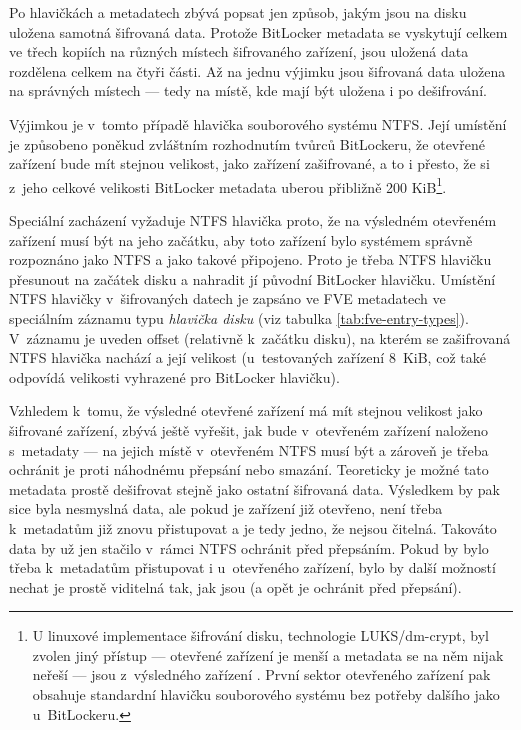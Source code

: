 Po hlavičkách a metadatech zbývá popsat jen způsob, jakým jsou na disku uložena samotná šifrovaná data. Protože BitLocker metadata se vyskytují celkem ve třech kopiích na různých místech  šifrovaného zařízení, jsou uložená data rozdělena celkem na čtyři části. Až na jednu výjimku jsou šifrovaná data uložena na správných místech --- tedy na místě, kde mají být uložena i po dešifrování.

Výjimkou je v~tomto případě hlavička souborového systému NTFS. Její umístění je způsobeno poněkud zvláštním rozhodnutím tvůrců BitLockeru, že otevřené zařízení bude mít stejnou velikost, jako zařízení zašifrované, a to i přesto, že si z~jeho celkové velikosti BitLocker metadata uberou přibližně 200 KiB\footnote{U linuxové implementace šifrování disku, technologie LUKS/dm-crypt, byl zvolen jiný přístup --- otevřené zařízení je menší a metadata se na něm nijak neřeší --- jsou z~výsledného zařízení . První sektor otevřeného zařízení pak obsahuje standardní hlavičku souborového systému bez potřeby dalšího  jako u~BitLockeru.}.


Speciální zacházení vyžaduje NTFS hlavička proto, že na výsledném otevřeném zařízení musí být na jeho začátku, aby toto zařízení bylo systémem správně rozpoznáno jako NTFS a jako takové připojeno. Proto je třeba NTFS hlavičku přesunout na začátek disku a nahradit jí původní BitLocker hlavičku. Umístění NTFS hlavičky v~šifrovaných datech je zapsáno ve FVE metadatech ve speciálním záznamu typu \emph{hlavička disku} (viz tabulka \ref{tab:fve-entry-types}). V~záznamu je uveden offset (relativně k~začátku disku), na kterém se zašifrovaná NTFS hlavička nachází a její velikost (u~testovaných zařízení 8~KiB, což také odpovídá velikosti vyhrazené pro BitLocker hlavičku).

Vzhledem k~tomu, že výsledné otevřené zařízení má mít stejnou velikost jako šifrované zařízení, zbývá ještě vyřešit, jak bude v~otevřeném zařízení naloženo s~metadaty --- na jejich místě v~otevřeném NTFS musí  být a zároveň je třeba ochránit je proti náhodnému přepsání nebo smazání. Teoreticky je možné tato metadata prostě dešifrovat stejně jako ostatní šifrovaná data. Výsledkem by pak sice byla nesmyslná data, ale pokud je zařízení již otevřeno, není třeba k~metadatům již znovu přistupovat a je tedy jedno, že nejsou čitelná. Takováto  data by už jen stačilo v~rámci NTFS ochránit před přepsáním. Pokud by bylo třeba k~metadatům přistupovat i u~otevřeného zařízení, bylo by další možností nechat je prostě viditelná tak, jak jsou (a opět je ochránit před přepsání).

